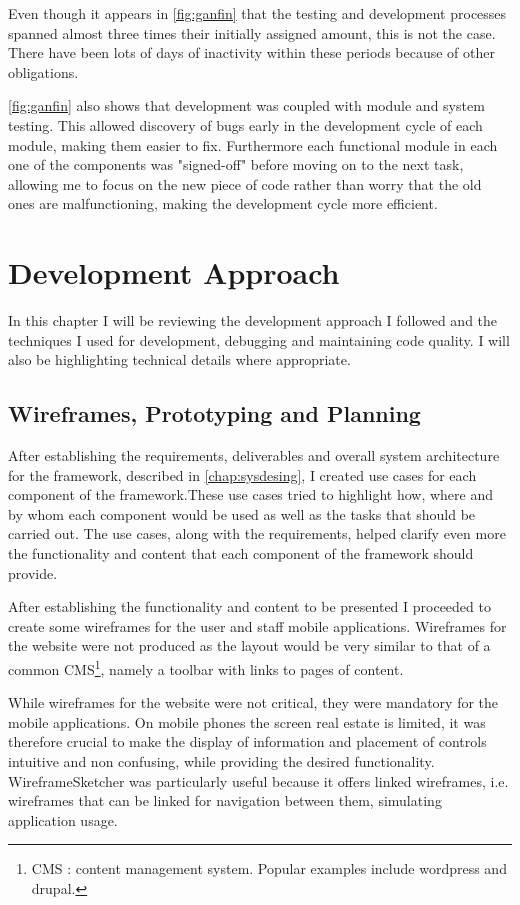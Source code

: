 \documentclass[12pt]{ecsproject}     %
\begin{document}
Even though it appears in \ref{fig:ganfin} that the testing and development processes spanned almost three times their initially assigned amount, this is not the case. There have been lots of days of inactivity within these periods because of other obligations. 

\ref{fig:ganfin} also shows that development was coupled with module and system testing. This allowed discovery of bugs early in the development cycle of each module, making them easier to fix. Furthermore each functional module in each one of the components was "signed-off" before moving on to the next task, allowing me to focus on the new piece of code rather than worry that the old ones are malfunctioning, making the development cycle more efficient.


\chapter{Development Approach}
\label{chap:devel}
In this chapter I will be reviewing the development approach I followed and the techniques I used for development, debugging and maintaining code quality. I will also be highlighting technical details where appropriate.


\section{Wireframes, Prototyping and Planning}
After establishing the requirements, deliverables and overall system architecture for the framework, described in \ref{chap:sysdesing}, I created use cases for each component of the framework.These use cases tried to highlight how, where and by whom each component would be used as well as the tasks that should be carried out. The use cases, along with the requirements, helped clarify even more the functionality and content that each component of the framework should provide.

After establishing the functionality and content to be presented I proceeded to create some wireframes for the user and staff mobile applications. Wireframes for the website were not produced as the layout would be very similar to that of a common CMS\footnote{CMS : content management system. Popular examples include wordpress and drupal.}, namely a toolbar with links to pages of content. 

While wireframes for the website were not critical, they were mandatory for the mobile applications. On mobile phones the screen real estate is limited, it was therefore crucial to make the display of information and placement of controls intuitive and non confusing, while providing the desired functionality. WireframeSketcher was particularly useful because it offers linked wireframes, i.e. wireframes that can be linked for navigation between them, simulating application usage. 
\end{document}
